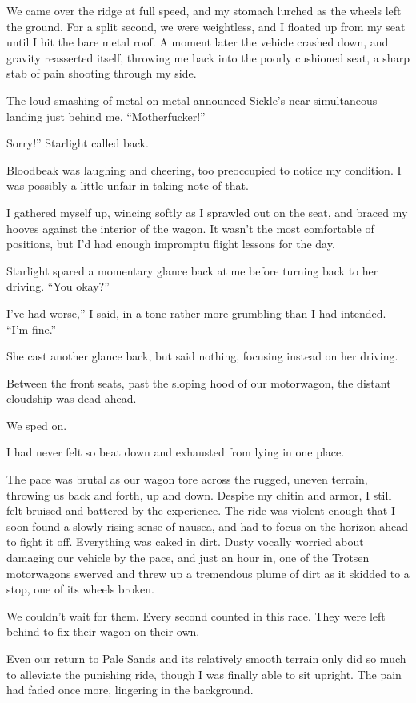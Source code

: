 We came over the ridge at full speed, and my stomach lurched as the wheels left the ground. For a split second, we were weightless, and I floated up from my seat until I hit the bare metal roof. A moment later the vehicle crashed down, and gravity reasserted itself, throwing me back into the poorly cushioned seat, a sharp stab of pain shooting through my side.

The loud smashing of metal-on-metal announced Sickle’s near-simultaneous landing just behind me. “Motherfucker!”

\leavevmode{}Sorry!” Starlight called back.

Bloodbeak was laughing and cheering, too preoccupied to notice my condition. I was possibly a little unfair in taking note of that.

I gathered myself up, wincing softly as I sprawled out on the seat, and braced my hooves against the interior of the wagon. It wasn’t the most comfortable of positions, but I’d had enough impromptu flight lessons for the day.

Starlight spared a momentary glance back at me before turning back to her driving. “You okay?”

\leavevmode{}I’ve had worse,” I said, in a tone rather more grumbling than I had intended. “I’m fine.”

She cast another glance back, but said nothing, focusing instead on her driving.

Between the front seats, past the sloping hood of our motorwagon, the distant cloudship was dead ahead.

We sped on.

{\br}%
I had never felt so beat down and exhausted from lying in one place.

The pace was brutal as our wagon tore across the rugged, uneven terrain, throwing us back and forth, up and down. Despite my chitin and armor, I still felt bruised and battered by the experience. The ride was violent enough that I soon found a slowly rising sense of nausea, and had to focus on the horizon ahead to fight it off. Everything was caked in dirt. Dusty vocally worried about damaging our vehicle by the pace, and just an hour in, one of the Trotsen motorwagons swerved and threw up a tremendous plume of dirt as it skidded to a stop, one of its wheels broken.

We couldn’t wait for them. Every second counted in this race. They were left behind to fix their wagon on their own.

Even our return to Pale Sands and its relatively smooth terrain only did so much to alleviate the punishing ride, though I was finally able to sit upright. The pain had faded once more, lingering in the background.

